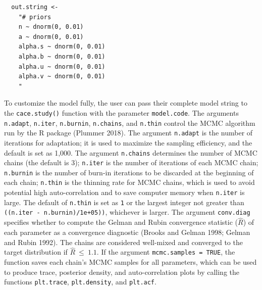 \begin{verbatim}
  out.string <-   
    "# priors
    n ~ dnorm(0, 0.01)
    a ~ dnorm(0, 0.01)
    alpha.s ~ dnorm(0, 0.01)
    alpha.b ~ dnorm(0, 0.01)
    alpha.u ~ dnorm(0, 0.01)
    alpha.v ~ dnorm(0, 0.01)
    "
\end{verbatim}

To customize the model fully, the user can pass their complete model string to the \texttt{cace.study()} function with the parameter \texttt{model.code}. The arguments \texttt{n.adapt}, \texttt{n.iter}, \texttt{n.burnin}, \texttt{n.chains}, and \texttt{n.thin} control the MCMC algorithm run by the R package  (Plummer 2018). The argument \texttt{n.adapt} is the number of iterations for adaptation; it is used to maximize the sampling efficiency, and the default is set as 1,000. The argument \texttt{n.chains} determines the number of MCMC chains (the default is 3); \texttt{n.iter} is the number of iterations of each MCMC chain; \texttt{n.burnin} is the number of burn-in iterations to be discarded at the beginning of each chain; \texttt{n.thin} is the thinning rate for MCMC chains, which is used to avoid potential high auto-correlation and to save computer memory when \texttt{n.iter} is large. The default of \texttt{n.thin} is set as \texttt{1} or the largest integer not greater than \texttt{((n.iter\ -\ n.burnin)/1e+05))}, whichever is larger.
The argument \texttt{conv.diag} specifies whether to compute the Gelman and Rubin convergence statistic (\(\hat{R}\)) of each parameter as a convergence diagnostic (Brooks and Gelman 1998; Gelman and Rubin 1992). The chains are considered well-mixed and converged to the target distribution if \(\hat{R}\ \mathrm{\le}\ \mathrm{1.1}\). If the argument \texttt{mcmc.samples\ =\ TRUE}, the function saves each chain's MCMC samples for all parameters, which can be used to produce trace, posterior density, and auto-correlation plots by calling the functions \texttt{plt.trace}, \texttt{plt.density}, and \texttt{plt.acf}.

